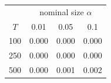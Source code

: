 % 
\begin{tabular}{cccc}
  \hline
  & \multicolumn{3}{c}{nominal size $\alpha$} \\
 $T$ & 0.01 & 0.05 & 0.1 \\
 \hline
100 & 0.000 & 0.000 & 0.000 \\ 
  250 & 0.000 & 0.000 & 0.000 \\ 
  500 & 0.000 & 0.001 & 0.002 \\ 
   \hline
\end{tabular}
